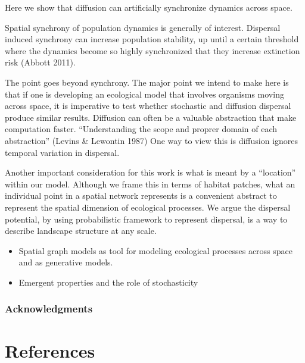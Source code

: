 \documentclass[11pt]{article}
\begin{document}
Here we show that diffusion can artificially synchronize dynamics across
space.

Spatial synchrony of population dynamics is generally of interest.
Dispersal induced synchrony can increase population stability, up until
a certain threshold where the dynamics become so highly synchronized
that they increase extinction risk (Abbott 2011).

The point goes beyond synchrony. The major point we intend to make here
is that if one is developing an ecological model that involves organisms
moving across space, it is imperative to test whether stochastic and
diffusion dispersal produce similar results. Diffusion can often be a
valuable abstraction that make computation faster. ``Understanding the
scope and proprer domain of each abstraction'' (Levins \& Lewontin 1987)
One way to view this is diffusion ignores temporal variation in
dispersal.

Another important consideration for this work is what is meant by a
``location'' within our model. Although we frame this in terms of
habitat patches, what an individual point in a spatial network
represents is a convenient abstract to represent the spatial dimension
of ecological processes. We argue the dispersal potential, by using
probabilistic framework to represent dispersal, is a way to describe
landscape structure at any scale.

\begin{itemize}
\tightlist
\item
  Spatial graph models as tool for modeling ecological processes across
  space and as generative models.
\item
  Emergent properties and the role of stochasticity
\end{itemize}

\hypertarget{acknowledgments}{%
\subsubsection{Acknowledgments}\label{acknowledgments}}

\hypertarget{references}{%
\section*{References}\label{references}}
\end{document}
